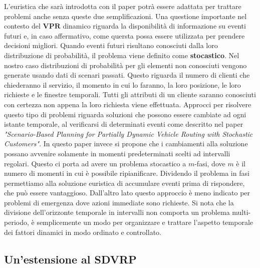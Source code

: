 \documentclass[
]{article}
\begin{document}
L'euristica che sarà introdotta con il paper potrà essere adattata per
trattare problemi anche senza queste due semplificazioni. Una questione
importante nel contesto del {\(\mathbf{VPR}\)} dinamico riguarda la
disponibilità di informazione su eventi futuri e, in caso affermativo,
come quersta possa essere utilizzata per prendere decisioni migliori.
Quando eventi futuri risultano conosciuti dalla loro distribuzione di
probabilità, il problema viene definito come \textbf{stocastico}. Nel
nostro caso distribuzioni di probabilità per gli elementi non conosciuti
vengono generate usando dati di scenari passati. Questo riguarda il
numero di clienti che chiederanno il servizio, il momento in cui lo
faranno, la loro posizione, le loro richieste e le finestre temporali.
Tutti gli attributi di un cliente saranno conosciuti con certezza non appena la loro richiesta viene effettuata. Approcci per risolvere questo
tipo di problemi riguarda soluzioni che possono essere cambiate ad ogni
istante temporale, al verificarsi di determinati eventi come descritto nel paper \textit{"Scenario-Based Planning for Partially Dynamic Vehicle Routing with
Stochastic Customers"}. In questo paper invece si propone che i
cambiamenti alla soluzione possano avvenire solamente in momenti
predeterminati scelti ad intervalli regolari. Questo ci porta ad avere
un problema stocastico a {\(m\)}-fasi, dove {\(m\)} è il numero di
momenti in cui è possibile ripianificare. Dividendo il problema in fasi
permettiamo alla soluzione euristica di accumulare eventi prima di
rispondere, che può essere vantaggioso. Dall'altro lato questo approccio
è meno indicato per problemi di emergenza dove azioni immediate sono
richieste. Si nota che la divisione dell'orizzonte temporale in
intervalli non comporta un problema multi-periodo, è semplicemente un
modo per organizzare e trattare l'aspetto temporale dei fattori dinamici
in modo ordinato e controllato.

\hypertarget{unestensione-al-mathbfsdvrp}{%
\subsection{\texorpdfstring{Un'estensione al
SDVRP}{Un'estensione al SDVRP}}\label{unestensione-al-mathbfsdvrp}}
\end{document}
